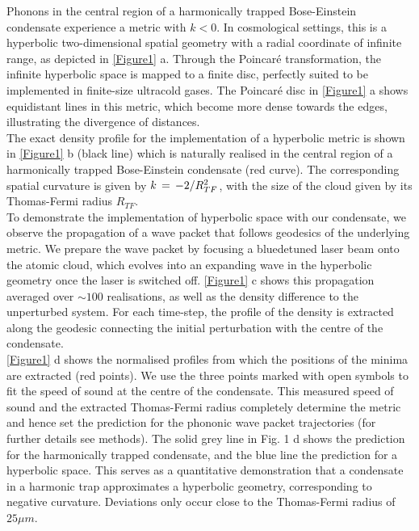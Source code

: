 \documentclass[11pt,twocolumn,letterpaper]{article}
\newcounter{ns}
\begin{document}
Phonons in the central region of a harmonically trapped Bose-Einstein condensate experience a metric with $k < 0$. In cosmological settings, this is a hyperbolic two-dimensional spatial geometry with a radial coordinate of infinite range, as depicted in \ref{Figure1} a. Through the Poincaré transformation, the infinite hyperbolic space is mapped to a finite disc, perfectly suited to be implemented in finite-size ultracold gases. The Poincaré disc in \ref{Figure1} a shows equidistant lines in this metric, which become more dense towards the edges, illustrating the divergence of distances.\\

The exact density profile for the implementation of a hyperbolic metric is shown in \ref{Figure1} b (black line) which is naturally realised in the central region of a harmonically trapped Bose-Einstein condensate (red curve). The corresponding spatial curvature is given by $k \thinspace = \thinspace -2/R^{2}_{TF}$, with the size of the cloud given by its Thomas-Fermi radius $R_{TF}$.\\

To demonstrate the implementation of hyperbolic space with our condensate, we observe the propagation of a wave packet that follows geodesics of the underlying metric. We prepare the wave packet by focusing a bluedetuned laser beam onto the atomic cloud, which evolves into an expanding wave in the hyperbolic geometry once the laser is switched off. \ref{Figure1} c shows this propagation averaged over $\sim 100$ realisations, as well as the density difference to the unperturbed system. For each time-step, the profile of the density is extracted along the geodesic connecting the initial perturbation with the centre of the condensate.\\

\ref{Figure1} d shows the normalised profiles from which the positions of the minima are extracted (red points). We use the three points marked with open symbols to fit the speed of sound at the centre of the condensate. This measured speed of sound and the extracted Thomas-Fermi radius completely determine the metric and hence set the prediction for the phononic wave packet trajectories (for further details see methods). The solid grey line in Fig. 1 d shows the prediction for the harmonically trapped condensate, and the blue line the prediction for a hyperbolic space. This serves as a quantitative demonstration that a condensate in a harmonic trap approximates a hyperbolic geometry, corresponding to negative curvature. Deviations only occur close to the Thomas-Fermi radius of $25 \mu m$.
\end{document}
